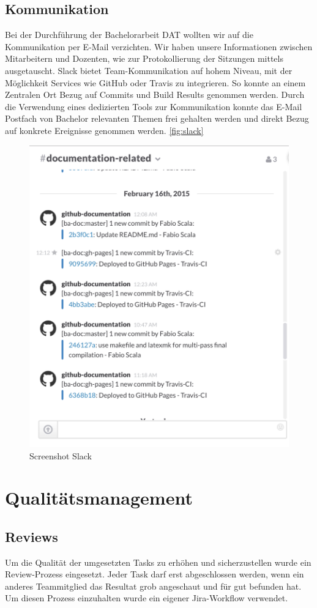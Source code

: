 \section{Kommunikation}
Bei der Durchführung der Bachelorarbeit DAT wollten wir auf die Kommunikation per E-Mail verzichten. Wir haben unsere Informationen zwischen Mitarbeitern und Dozenten, wie zur Protokollierung der Sitzungen mittels  ausgetauscht. Slack bietet Team-Kommunikation auf hohem Niveau, mit der Möglichkeit Services wie GitHub oder Travis zu integrieren. So konnte an einem Zentralen Ort Bezug auf Commits und Build Results genommen werden. Durch die Verwendung eines dedizierten Tools zur Kommunikation konnte das E-Mail Postfach von Bachelor relevanten Themen frei gehalten werden und direkt Bezug auf konkrete Ereignisse genommen werden. \vref{fig:slack} \\

\begin{figure}[H]
	\centering
	\includegraphics[width=0.5\linewidth]{fig/slack}
	\caption{Screenshot Slack}
	\label{fig:slack}
\end{figure}

\chapter{Qualitätsmanagement}

\section{Reviews}

Um die Qualität der umgesetzten Tasks zu erhöhen und sicherzustellen wurde ein Review-Prozess eingesetzt. Jeder Task darf erst abgeschlossen werden, wenn ein anderes Teammitglied das Resultat grob angeschaut und für gut befunden hat. Um diesen Prozess einzuhalten wurde ein eigener Jira-Workflow verwendet.

